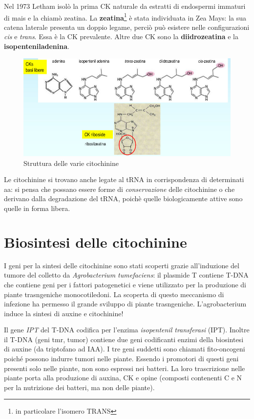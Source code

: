 \documentclass[a4paper,12pt]{book}
\begin{document}
Nel 1973 Letham isolò la prima CK naturale da estratti di endospermi immaturi di mais e la chiamò zeatina. La \textbf{zeatina}\footnote{in particolare l'isomero TRANS} è stata individuata in Zea Mays: la sua catena laterale presenta un doppio legame, perciò può esistere nelle configurazioni \emph{cis} e \emph{trans}. Essa è la CK prevalente. Altre due CK sono la \textbf{diidrozeatina} e la \textbf{isopenteniladenina}.
\begin{figure}[H]
\centering
\includegraphics[scale=.35]{immagini/CK.jpg}
\caption{Struttura delle varie citochinine}
\end{figure}
Le citochinine si trovano anche legate al tRNA in corrispondenza di determinati aa: si pensa che possano essere forme di \emph{conservazione} delle citochinine o che derivano dalla degradazione del tRNA, poichè quelle biologicamente attive sono quelle in forma libera.

\section{Biosintesi delle citochinine}
I geni per la sintesi delle citochinine sono stati scoperti grazie all'induzione del tumore del colletto da \emph{Agrobacterium tumefaciens}: il plasmide T contiene T-DNA che contiene geni per i fattori patogenetici e viene utilizzato per la produzione di piante trasngeniche monocotiledoni. La scoperta di questo meccanismo di infezione ha permesso il grande sviluppo di piante trasngeniche. L'agrobacterium induce la sintesi di auxine e citochinine! 

Il gene \emph{IPT} del T-DNA codifica per l’enzima \emph{isopentenil transferasi} (IPT). Inoltre il T-DNA (geni tmr, tumor) contiene due geni codificanti enzimi della biosintesi di auxine (da triptofano ad IAA). I tre geni suddetti
sono chiamati fito-oncogeni poiché possono indurre tumori nelle piante. Essendo i promotori di questi
geni presenti solo nelle piante, non sono espressi nei batteri. La loro trascrizione nelle piante porta alla
produzione di auxina, CK e opine (composti contenenti C e N per la nutrizione dei batteri, ma non delle
piante).
\end{document}
